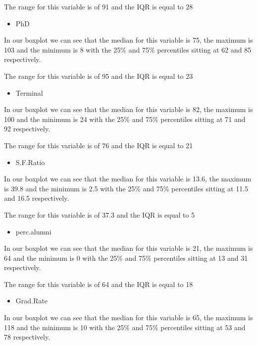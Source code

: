 \documentclass[]{article}
\providecommand{\tightlist}{%
  \setlength{\itemsep}{0pt}\setlength{\parskip}{0pt}}
\begin{document}
The range for this variable is of 91 and the IQR is equal to 28

\begin{itemize}
\tightlist
\item
  PhD
\end{itemize}

In our boxplot we can see that the median for this variable is 75, the
maximum is 103 and the minimum is 8 with the 25\% and 75\% percentiles
sitting at 62 and 85 respectively.

The range for this variable is of 95 and the IQR is equal to 23

\begin{itemize}
\tightlist
\item
  Terminal
\end{itemize}

In our boxplot we can see that the median for this variable is 82, the
maximum is 100 and the minimum is 24 with the 25\% and 75\% percentiles
sitting at 71 and 92 respectively.

The range for this variable is of 76 and the IQR is equal to 21

\begin{itemize}
\tightlist
\item
  S.F.Ratio
\end{itemize}

In our boxplot we can see that the median for this variable is 13.6, the
maximum is 39.8 and the minimum is 2.5 with the 25\% and 75\%
percentiles sitting at 11.5 and 16.5 respectively.

The range for this variable is of 37.3 and the IQR is equal to 5

\begin{itemize}
\tightlist
\item
  perc.alumni
\end{itemize}

In our boxplot we can see that the median for this variable is 21, the
maximum is 64 and the minimum is 0 with the 25\% and 75\% percentiles
sitting at 13 and 31 respectively.

The range for this variable is of 64 and the IQR is equal to 18

\begin{itemize}
\tightlist
\item
  Grad.Rate
\end{itemize}

In our boxplot we can see that the median for this variable is 65, the
maximum is 118 and the minimum is 10 with the 25\% and 75\% percentiles
sitting at 53 and 78 respectively.
\end{document}
